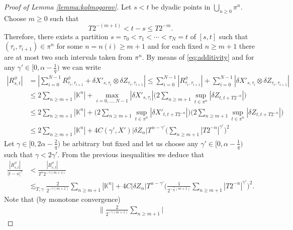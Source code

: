 \documentclass[11pt,a4paper]{article}
\theoremstyle{plain}
\begin{document}
\begin{appendices}
\begin{proof}[Proof of Lemma \ref{lemma:kolmogorov}]
Let $s < t$ be dyadic points in $\bigcup_{n \geqslant 0} \pi^n$. Choose $m
\geqslant 0$ such that
\[ T 2^{- (m + 1)} < t - s \leq T 2^{- m} . \]
Therefore, there exists a partition $s = \tau_0 < \tau_1 < \cdots < \tau_N =
t$ of $[s, t]$ such that \linebreak $(\tau_i , \tau_{i + 1}) \in \pi^n$ for some $n = n
(i) \geqslant m + 1$ and for each fixed $n \geqslant m + 1$ there are
at most two such intervals taken from $\pi^n$. 
By means of
\eqref{eq:additivity} and for any $\gamma' \in [ 0, \alpha - \frac{1}{q})$ we can write
\begin{align*}
    | R^{\phi}_{s, t} | & = \left| \sum_{i = 0}^{N - 1} R^{\phi}_{\tau_i, \tau_{i + 1}} + \delta X'_{s, \tau_i} \otimes \delta Z_{\tau_i, \tau_{i + 1}}  \right| 
    \le  \sum_{i = 0}^{N - 1} | R^{\phi}_{\tau_i, \tau_{i + 1}} | +  \sum_{i = 0}^{N - 1} | \delta X'_{s, \tau_i} \otimes
    \delta Z_{\tau_i, \tau_{i + 1}} | \\
    & \le 2 \sum_{n \geqslant m + 1} | \mathbb{K}^n | + \max_{i = 0, \ldots, N - 1} | \delta X'_{s, \tau_i} |  \Big( 2 \sum_{n \geqslant m + 1} \sup_{t \in \pi^n} | \delta  Z_{t, t + T 2^{- n}} | \Big) \\
    & \le 2 \sum_{n \geqslant m + 1} | \mathbb{K}^n | + \Big( 2  \sum_{n \geqslant m + 1} \sup_{t \in \pi^n} | \delta X'_{t, t + T 2^{- n}} | \Big) \Big( 2 \sum_{n \geqslant m + 1} \sup_{t \in \pi^n} | \delta Z_{t,  t + T 2^{- n}} | \Big) \\
    & \le 2 \sum_{n \geqslant m + 1} | \mathbb{K}^n | + 4 C(\gamma', X') | \delta Z_{\alpha}
  | T^{\alpha - \gamma'} \Big( \sum_{n \geqslant m + 1} | T 2^{- n} |^{\gamma'}  \Big)^2
\end{align*}
Let $\gamma \in [ 0, 2 \alpha - \frac{2}{q} )$ be arbitrary but
fixed and let us choose any $\gamma' \in [ 0, \alpha - \frac{1}{q})$ such that $\gamma < 2 \gamma'$. From the previous inequalities we
deduce that
    \begin{align*}
  \frac{| R^{\phi}_{s, t} |}{| t - s |^{\gamma}}  &<  \frac{| R^{\phi}_{s, t}
  |}{T^\gamma 2^{- \gamma (m + 1)}} \\
  &\lesssim_{T, \gamma}  \frac{2 }{2^{- \gamma (m + 1)}} 
   \sum_{n \geqslant m + 1} |
  \mathbb{K}^n | + 4  C | \delta Z_{\alpha} | T^{\alpha - \gamma'}  \Big(
  \frac{1}{2^{- \frac{\gamma}{2} (m + 1)}} \sum_{n \geqslant m + 1} | T 2^{- n}
  |^{\gamma'} \Big)^2 .
\end{align*}
Note that (by monotone convergence)
\begin{eqnarray*}
  \Big\| \frac{2}{2^{- \gamma (m + 1)}} \sum_{n \geqslant m + 1} |

\end{eqnarray*}
\end{proof}
\end{appendices}
\end{document}
